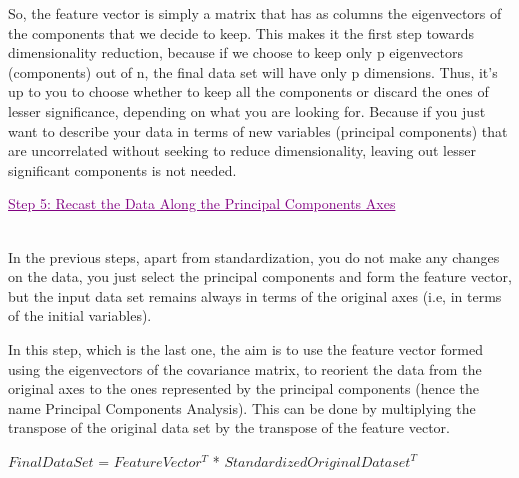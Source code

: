 So, the feature vector is simply a matrix that has as columns the eigenvectors of the components that we decide to keep. This makes it the first step towards dimensionality reduction, because if we choose to keep only p eigenvectors (components) out of n, the final data set will have only p dimensions.
Thus, it’s up to you to choose whether to keep all the components or discard the ones of lesser significance, depending on what you are looking for. Because if you just want to describe your data in terms of new variables (principal components) that are uncorrelated without seeking to reduce dimensionality, leaving out lesser significant components is not needed.\\[0.2 cm]
\textcolor{purple}{\centerline{\underline{{Step 5: Recast the Data Along the Principal Components Axes }}}}\\[0.2 cm]
In the previous steps, apart from standardization, you do not make any changes on the data, you just select the principal components and form the feature vector, but the input data set remains always in terms of the original axes (i.e, in terms of the initial variables).

In this step, which is the last one, the aim is to use the feature vector formed using the eigenvectors of the covariance matrix, to reorient the data from the original axes to the ones represented by the principal components (hence the name Principal Components Analysis). This can be done by multiplying the transpose of the original data set by the transpose of the feature vector.\\[0.2 cm]
\centerline{$FinalDataSet$ = $FeatureVector^T$ * $StandardizedOriginalDataset^T$}